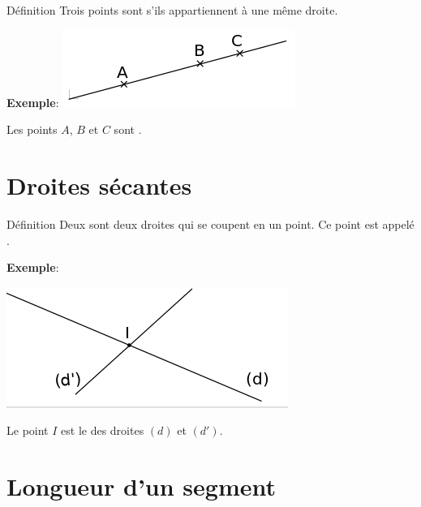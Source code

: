 \documentclass[12pt,a4paper]{article}
\begin{document}
\begin{minipage}{0.4\textwidth}
\begin{definition}{Définition}
Trois points sont  s'ils appartiennent à une même droite.
\end{definition}
\end{minipage}
\begin{minipage}{0.25\textwidth}
\textbf{Exemple}:
\includegraphics[scale=0.6]{img/alignement.png} 
\end{minipage}
\begin{minipage}{0.4\textwidth}
Les points $A$, $B$ et $C$ sont .
\end{minipage}

\section{Droites sécantes}

\begin{definition}{Définition}
Deux  sont deux droites qui se coupent en un point. Ce point est appelé .
\end{definition}

\textbf{Exemple}:\\
\begin{center}
\begin{minipage}{0.4\textwidth}
\includegraphics[scale=0.8]{img/secantes.png}
\end{minipage}
\begin{minipage}{0.4\textwidth}
Le point $I$ est le  des droites $(d)$ et $(d')$.
\end{minipage}
\end{center}

\section{Longueur d'un segment}
\end{document}
